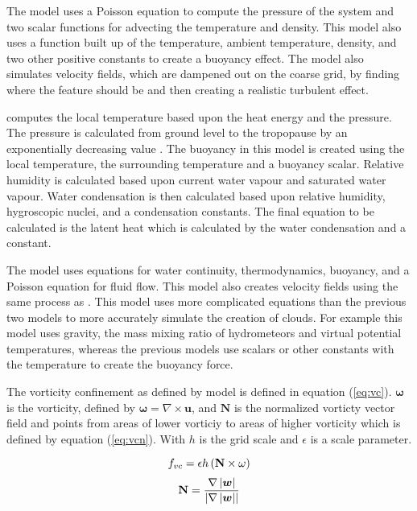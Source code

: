 The \citet*{Fedkiw01} model uses a Poisson equation to compute the pressure of the system and two scalar functions for advecting the temperature and density.
This model also uses a function built up of the temperature, ambient temperature, density, and two other positive constants to create a buoyancy effect.
The model also simulates velocity fields, which are dampened out on the coarse grid, by finding where the feature should be and then creating a realistic turbulent effect.

\citet*{DOverby02} computes the local temperature based upon the heat energy and the pressure.
The pressure is calculated from ground level to the tropopause by an exponentially decreasing value \citep*{DOverby02}.
The buoyancy in this model is created using the local temperature, the surrounding temperature and a buoyancy scalar.
Relative humidity is calculated based upon current water vapour and saturated water vapour.
Water condensation is then calculated based upon relative humidity, hygroscopic nuclei, and a condensation constants.
The final equation to be calculated is the latent heat which is calculated by the water condensation and a constant.
 
The \citet{HarrisEtAl03} model uses equations for water continuity, thermodynamics, buoyancy, and a Poisson equation for fluid flow.
This model also creates velocity fields using the same process as \citet*{Fedkiw01}.
This model uses more complicated equations than the previous two models to more accurately simulate the creation of clouds.
For example this model uses gravity, the mass mixing ratio of hydrometeors and virtual potential temperatures, whereas the previous models use scalars or other constants with the temperature to create the buoyancy force.

The vorticity confinement as defined by \citet{HarrisEtAl03} model is defined in equation (\ref{eq:vc}).
$\boldsymbol{\omega}$ is the vorticity, defined by $\boldsymbol{\omega} = \nabla\times\mathbf{u}$, and $\mathbf{N}$ is the normalized vorticty vector field and points from areas of lower vorticiy to areas of higher vorticity which is defined by equation (\ref{eq:vcn}).
With $h$ is the grid scale and $\epsilon$ is a scale parameter.

\begin{equation} \label{eq:vc}
  \centering
  f_{vc} = \epsilon h\left(\mathbf{N}\times\omega\right)
\end{equation}
\begin{equation} \label{eq:vcn}
  \centering
  \mathbf{N} = \frac{\nabla\left|\boldsymbol{w}\right|}{\left|\nabla\left|\boldsymbol{w}\right|\right|}
\end{equation}

